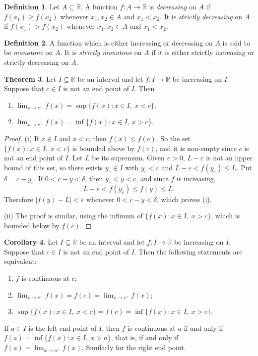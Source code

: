 \documentclass[11pt,a4paper]{article}
\numberwithin{equation}{section}
\theoremstyle{definition}
\newtheorem{thm}{Theorem}[subsection]
\newtheorem{defn}[thm]{Definition}
\newtheorem{coro}[thm]{Corollary}
\begin{document}
\begin{defn}
Let $A\subseteq \mathbb{R}$. A function $f: A\longrightarrow \mathbb{R}$ is \emph{decreasing} on $A$ if $f(x_1) \geq f(x_2)$ whenever $x_1, x_2 \in A$ and $x_1 < x_2$. It is \emph{strictly decreasing} on $A$ if $f(x_1) > f(x_2)$ whenever $x_1, x_2\in A$ and $x_1 < x_2$.
\end{defn}


\begin{defn}
A function which is either increasing or decreasing on $A$ is said to be \emph{monotone} on $A$. It is \emph{strictly monotone} on $A$ if it is either strictly increasing or strictly decreasing on $A$.
\end{defn}


\begin{thm}
Let $I\subseteq \mathbb{R}$ be an interval and let $f: I \longrightarrow \mathbb{R}$ be increasing on $I$. Suppose that $c\in I$ is not an end point of $I$. Then
\begin{enumerate}
\item[(i)] $\lim_{x\rightarrow c^-}f(x) = \sup \{f(x): x\in I,\ x<c\}$;
\item[(ii)] $\lim_{x\rightarrow c^+}f(x) = \inf \{f(x): x\in I,\ x>c\}$.
\end{enumerate}
\end{thm}

\begin{proof}
(i) If $x\in I$ and $x<c$, then $f(x) \leq f(c)$. So the set $\{f(x): x\in I,\ x < c\}$ is bounded above by $f(c)$, and it is non-empty since $c$ is not an end point of $I$. Let $L$ be its supremum. Given $\varepsilon > 0$, $L- \varepsilon$ is not an upper bound of this set, so there exists $y_{\varepsilon}\in I$ with $y_{\varepsilon} < c$ and $L - \varepsilon < f(y_{\varepsilon}) \leq L$. Put $\delta = c- y_{\varepsilon}$. If $0 < c - y < \delta$, then $y_{\varepsilon} < y < c$, and since $f$ is increasing,
$$L-\varepsilon < f(y_{\varepsilon}) \leq f(y) \leq L .$$
Therefore $|f(y)  - L| < \varepsilon$ whenever $0 < c  - y < \delta$, which proves (i).

(ii) The proof is similar, using the infimum of $\{f(x): x\in I,\ x>c\}$, which is bounded below by $f(c)$.
\end{proof}


\begin{coro}
Let $I\subseteq \mathbb{R}$ be an interval and let $f: I \longrightarrow \mathbb{R}$ be increasing on $I$. Suppose that $c\in I$ is not an end point of $I$. Then the following statements are equivalent:
\begin{enumerate}
\item $f$ is continuous at $c$;
\item $\lim_{x\rightarrow c^-} f(x) = f(c) = \lim_{x\rightarrow c^+} f(x)$;
\item $\sup \{f(x): x\in I,\ x<c\} = f(c) = \inf \{f(x): x\in I,\ x>c\}$.
\end{enumerate}
If $a\in I$ is the left end point of $I$, then $f$ is continuous at $a$ if and only if $f(a) = \inf\{ f(x): x\in I,\ x>a\}$, that is, if and only if $f(a) = \lim_{x\rightarrow a^+} f(x)$. Similarly for the right end point.
\end{coro}
\end{document}

